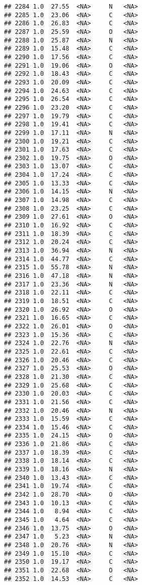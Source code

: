 \documentclass[
]{article}
\begin{document}
\begin{verbatim}
## 2284 1.0  27.55  <NA>     N   <NA>
## 2285 1.0  23.06  <NA>     C   <NA>
## 2286 1.0  26.83  <NA>     C   <NA>
## 2287 1.0  25.59  <NA>     O   <NA>
## 2288 1.0  25.87  <NA>     N   <NA>
## 2289 1.0  15.48  <NA>     C   <NA>
## 2290 1.0  17.56  <NA>     C   <NA>
## 2291 1.0  19.06  <NA>     O   <NA>
## 2292 1.0  18.43  <NA>     C   <NA>
## 2293 1.0  20.09  <NA>     C   <NA>
## 2294 1.0  24.63  <NA>     C   <NA>
## 2295 1.0  26.54  <NA>     C   <NA>
## 2296 1.0  23.20  <NA>     C   <NA>
## 2297 1.0  19.79  <NA>     C   <NA>
## 2298 1.0  19.41  <NA>     C   <NA>
## 2299 1.0  17.11  <NA>     N   <NA>
## 2300 1.0  19.21  <NA>     C   <NA>
## 2301 1.0  17.63  <NA>     C   <NA>
## 2302 1.0  19.75  <NA>     O   <NA>
## 2303 1.0  13.07  <NA>     C   <NA>
## 2304 1.0  17.24  <NA>     C   <NA>
## 2305 1.0  13.33  <NA>     C   <NA>
## 2306 1.0  14.15  <NA>     N   <NA>
## 2307 1.0  14.98  <NA>     C   <NA>
## 2308 1.0  23.25  <NA>     C   <NA>
## 2309 1.0  27.61  <NA>     O   <NA>
## 2310 1.0  16.92  <NA>     C   <NA>
## 2311 1.0  18.39  <NA>     C   <NA>
## 2312 1.0  20.24  <NA>     C   <NA>
## 2313 1.0  36.94  <NA>     N   <NA>
## 2314 1.0  44.77  <NA>     C   <NA>
## 2315 1.0  55.78  <NA>     N   <NA>
## 2316 1.0  47.18  <NA>     N   <NA>
## 2317 1.0  23.36  <NA>     N   <NA>
## 2318 1.0  22.11  <NA>     C   <NA>
## 2319 1.0  18.51  <NA>     C   <NA>
## 2320 1.0  26.92  <NA>     O   <NA>
## 2321 1.0  16.65  <NA>     C   <NA>
## 2322 1.0  26.01  <NA>     O   <NA>
## 2323 1.0  15.36  <NA>     C   <NA>
## 2324 1.0  22.76  <NA>     N   <NA>
## 2325 1.0  22.61  <NA>     C   <NA>
## 2326 1.0  20.46  <NA>     C   <NA>
## 2327 1.0  25.53  <NA>     O   <NA>
## 2328 1.0  21.30  <NA>     C   <NA>
## 2329 1.0  25.68  <NA>     C   <NA>
## 2330 1.0  20.03  <NA>     C   <NA>
## 2331 1.0  21.56  <NA>     C   <NA>
## 2332 1.0  20.46  <NA>     N   <NA>
## 2333 1.0  15.59  <NA>     C   <NA>
## 2334 1.0  15.46  <NA>     C   <NA>
## 2335 1.0  24.15  <NA>     O   <NA>
## 2336 1.0  21.86  <NA>     C   <NA>
## 2337 1.0  18.39  <NA>     C   <NA>
## 2338 1.0  18.14  <NA>     C   <NA>
## 2339 1.0  18.16  <NA>     N   <NA>
## 2340 1.0  13.43  <NA>     C   <NA>
## 2341 1.0  19.74  <NA>     C   <NA>
## 2342 1.0  28.70  <NA>     O   <NA>
## 2343 1.0  10.13  <NA>     C   <NA>
## 2344 1.0   8.94  <NA>     C   <NA>
## 2345 1.0   4.64  <NA>     C   <NA>
## 2346 1.0  13.75  <NA>     O   <NA>
## 2347 1.0   5.23  <NA>     N   <NA>
## 2348 1.0  20.76  <NA>     N   <NA>
## 2349 1.0  15.10  <NA>     C   <NA>
## 2350 1.0  19.17  <NA>     C   <NA>
## 2351 1.0  22.68  <NA>     O   <NA>
## 2352 1.0  14.53  <NA>     C   <NA>

\end{verbatim}
\end{document}
